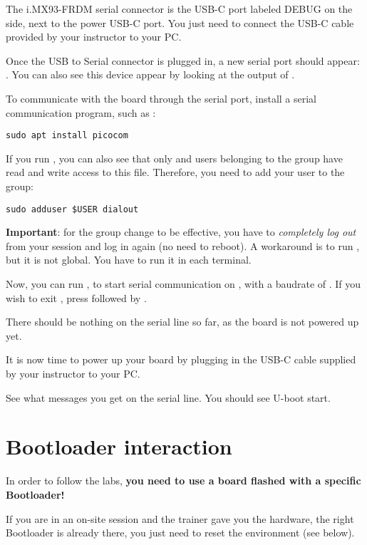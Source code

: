The i.MX93-FRDM serial connector is the USB-C port labeled DEBUG on the
side, next to the power USB-C port. You just need to connect the USB-C
cable provided by your instructor to your PC.

Once the USB to Serial connector is plugged in, a new serial port
should appear: .  You can also see this device
appear by looking at the output of .

To communicate with the board through the serial port, install a
serial communication program, such as :

\begin{verbatim}
sudo apt install picocom
\end{verbatim}

If you run , you can also see that only
 and users belonging to the  group have
read and write access to this file. Therefore, you need to add your user
to the  group:

\begin{verbatim}
sudo adduser $USER dialout
\end{verbatim}

{\bf Important}: for the group change to be effective, you have to
{\em completely log out} from your session and log in again (no need to
reboot). A workaround is to run , but it is not
global.
You have to run it in each terminal.

Now, you can run , to start serial
communication on , with a baudrate of . If
you wish to exit , press \code{[Ctrl][a]} followed by
\code{[Ctrl][x]}.

There should be nothing on the serial line so far, as the board is not
powered up yet.

It is now time to power up your board by plugging in the USB-C
cable supplied by your instructor to your PC.

See what messages you get on the serial line. You should see U-boot
start.

\section{Bootloader interaction}

In order to follow the labs, {\bf you need to use a board flashed
with a specific Bootloader!}

If you are in an on-site session and the trainer gave you the hardware,
the right Bootloader is already there, you just need to reset the
environment (see below).

